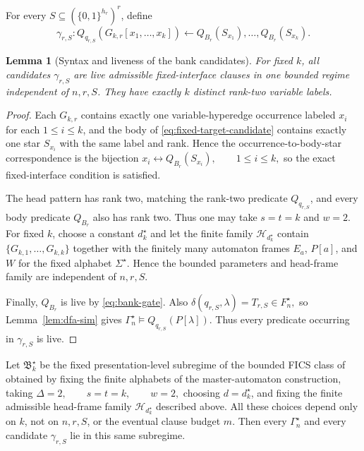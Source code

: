 \documentclass[11pt]{article}
\newtheorem{lemma}[theorem]{Lemma}
\theoremstyle{definition}
\theoremstyle{remark}
\begin{document}
For every \(S\subseteq(\{0,1\}^{h_r})^r\), define
\begin{equation}
\label{eq:fixed-target-candidate}
\gamma_{r,S}:
Q_{q_{r,S}}(G_{k,r}[x_1,\ldots,x_k])
\leftarrow
Q_{B_r}(S_{x_1}),\ldots,Q_{B_r}(S_{x_k}).
\end{equation}

\begin{lemma}[Syntax and liveness of the bank candidates]
\label{lem:bank-candidate-syntax}
For fixed \(k\), all candidates \(\gamma_{r,S}\) are live admissible
fixed-interface clauses in one bounded regime independent of \(n,r,S\).
They have exactly \(k\) distinct rank-two variable labels.
\end{lemma}

\begin{proof}
Each \(G_{k,r}\) contains exactly one variable-hyperedge occurrence labeled
\(x_i\) for each \(1\le i\le k\), and the body of
\eqref{eq:fixed-target-candidate} contains exactly one star \(S_{x_i}\) with
the same label and rank.  Hence the occurrence-to-body-star correspondence
is the bijection
\(x_i\longleftrightarrow Q_{B_r}(S_{x_i}), \qquad 1\le i\le k,\)
so the exact fixed-interface condition is satisfied.

The head pattern has rank two, matching the rank-two predicate
\(Q_{q_{r,S}}\), and every body predicate \(Q_{B_r}\) also has rank two.
Thus one may take \(s=t=k\) and \(w=2\).  For fixed \(k\), choose a constant
\(d_k^\star\) and let the finite family \(\mathcal H_{d_k^\star}\) contain
\(\{G_{k,1},\ldots,G_{k,k}\}\)
together with the finitely many automaton frames \(E_a\), \(P[a]\), and \(W\)
for the fixed alphabet \(\Sigma^\star\).  Hence the bounded parameters and
head-frame family are independent of \(n,r,S\).

Finally, \(Q_{B_r}\) is live by \eqref{eq:bank-gate}.  Also
\(\delta(q_{r,S},\lambda)=T_{r,S}\in F_n^\star,\)
so Lemma~\ref{lem:dfa-sim} gives
\(\Gamma_n^\star\models Q_{q_{r,S}}(P[\lambda]).\)
Thus every predicate occurring in \(\gamma_{r,S}\) is live.
\end{proof}

Let \(\mathfrak B_k^\star\) be the fixed presentation-level subregime of the
bounded FICS class of \cite{ShoudaiEtAl2026} obtained by fixing the finite
alphabets of the master-automaton construction, taking
\(\Delta=2,\qquad s=t=k,\qquad w=2,\)
choosing \(d=d_k^\star\), and fixing the finite admissible head-frame family
\(\mathcal H_{d_k^\star}\) described above.  All these choices depend only on
\(k\), not on \(n,r,S\), or the eventual clause budget \(m\).  Then every
\(\Gamma_n^\star\) and every candidate \(\gamma_{r,S}\) lie in this same
subregime.
\end{document}
